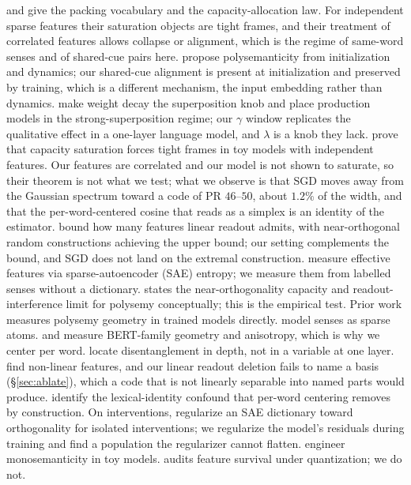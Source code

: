 \documentclass{article}
\begin{document}
\citet{elhage2022toy} and \citet{scherlis2022polysemanticity} give the packing
vocabulary and the capacity-allocation law. For independent sparse features their
saturation objects are tight frames, and their treatment of correlated features
allows collapse or alignment, which is the regime of same-word senses and of
shared-cue pairs here. \citet{lecomte2023incidental} propose
polysemanticity from initialization and dynamics; our shared-cue alignment is
present at initialization and preserved by training, which is a different
mechanism, the input embedding rather than dynamics.
\citet{liu2025superposition} make weight decay the superposition knob and place
production models in the strong-superposition regime; our $\gamma$ window replicates
the qualitative effect in a one-layer language model, and $\lambda$ is a knob they
lack. \citet{ivanov2026spectral} prove that capacity saturation forces tight frames in
toy models with independent features. Our features are correlated and our model is
not shown to saturate, so their theorem is not what we test; what we observe is that
SGD moves away from the Gaussian spectrum toward a code of PR $46$--$50$, about $1.2\%$
of the width, and that the per-word-centered cosine that reads as a simplex is an
identity of the estimator.
\citet{garg2026features} bound how many features linear readout admits, with
near-orthogonal random constructions achieving the upper bound; our setting
complements the bound, and SGD does not land on the extremal construction.
\citet{bereska2025lossy} measure effective features via
sparse-autoencoder (SAE) entropy; we
measure them from labelled senses without a dictionary. \citet{svozil2025quasi} states
the near-orthogonality capacity and readout-interference limit for polysemy conceptually;
this is the empirical test. Prior work measures polysemy geometry in trained
models directly. \citet{arora2018linear} model senses as sparse atoms.
\citet{coenen2019visualizing} and \citet{ethayarajh2019contextual} measure
BERT-family geometry and anisotropy, which is why we center per word.
\citet{minegishi2025pseval} locate disentanglement in depth, not in a variable at one
layer. \citet{engels2025notlinear} find non-linear features, and our linear readout
deletion fails to name a basis (\S\ref{sec:ablate}), which a code that is not
linearly separable into named parts would produce.
\citet{hou2026polysemanticity} identify the lexical-identity confound that per-word
centering removes by construction. On
interventions, \citet{miller2026isolated} regularize an SAE dictionary toward orthogonality
for isolated interventions; we regularize the model's residuals during training and find a
population the regularizer cannot flatten. \citet{jermyn2022engineering} engineer
monosemanticity in toy models. \citet{duan2026perplexity} audits feature survival under
quantization; we do not.
\end{document}
